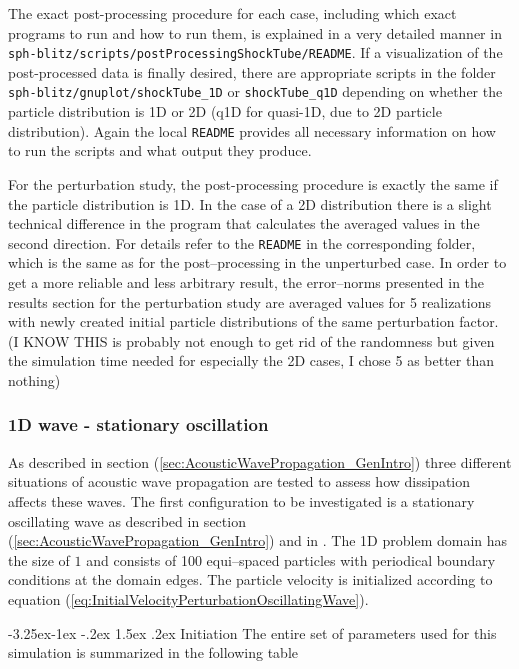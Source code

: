 \documentclass{report}
\makeatletter
\renewcommand\paragraph{\@startsection{paragraph}{4}{\z@}%
  {-3.25ex\@plus -1ex \@minus -.2ex}%
  {1.5ex \@plus .2ex}%
  {\normalfont\normalsize\bfseries}}
\makeatother
\begin{document}
The exact post-processing procedure for each case, including which exact programs to run and how to run them, is explained in a very detailed manner in {\tt sph-blitz/scripts/postProcessingShockTube/README}. If a visualization of the post-processed data is finally desired, there are appropriate scripts in the folder {\tt sph-blitz/gnuplot/shockTube\_1D} or {\tt shockTube\_q1D} depending on whether the particle distribution is 1D or 2D (q1D for quasi-1D, due to 2D particle distribution).
Again the local {\tt README} provides all necessary information on how to run the scripts and what output they produce.

For the perturbation study, the post-processing procedure is exactly the same if the particle distribution is 1D. In the case of a 2D distribution there is a slight technical difference in the program that calculates the averaged values in the second direction. For details refer to the {\tt README} in the corresponding folder, which is the same as for the post--processing in the unperturbed case.
In order to get a more reliable and less arbitrary result, the error--norms presented in the results section for the perturbation study are averaged values for 5 realizations with newly created initial particle distributions of the same perturbation factor. (I KNOW THIS is probably not enough to get rid of the randomness but given the simulation time needed for especially the 2D cases, I chose 5 as better than nothing)




\subsubsection{1D wave - stationary oscillation}
As described in section (\ref{sec:AcousticWavePropagation_GenIntro}) three different situations of acoustic wave propagation are tested to assess how dissipation affects these waves. The first configuration to be investigated is a stationary oscillating wave as described in section (\ref{sec:AcousticWavePropagation_GenIntro}) and in \cite{Monaghan2005}. The 1D problem domain has the size of $1$ and consists of 100 equi--spaced particles with periodical boundary conditions at the domain edges. The particle velocity is initialized according to equation (\ref{eq:InitialVelocityPerturbationOscillatingWave}).

\paragraph {Initiation}
The entire set of parameters used for this simulation is summarized in the following table
\end{document}
